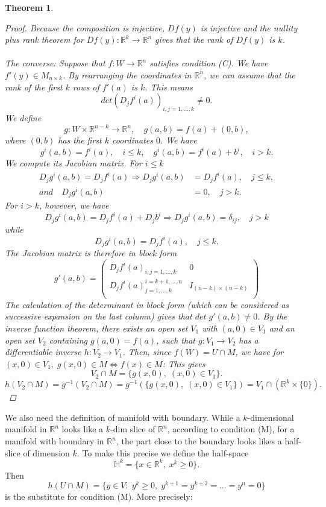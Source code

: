 \documentclass[12pt]{article}
\def\RR{\mathbb{R}}
\newtheorem{theorem}{Theorem}[section]
\begin{document}
\begin{theorem}
\begin{proof}
Because the composition is injective, $Df(y)$ is injective and the nullity plus rank theorem for $Df(y) : \RR^k \rightarrow \RR^n$ gives that the rank of $Df(y)$ is $k$.\\ \\
 \textit{The converse:} Suppose that $f : W \rightarrow \RR^n$ satisfies condition (C). We have $f'(y) \in M_{n\times k}$.
By rearranging the coordinates in $\RR^n$, we can assume that the rank of the first $k$ rows of $f'(a)$ is $k$. This means
\[det (D_jf^i(a))_{i,j=1,\dots ,k} \neq 0.\]
We define
\[g : W \times \RR^{n - k} \rightarrow \RR^n, \quad g(a, b) = f(a) + (0, b),\]
where $(0, b)$ has the first $k$ coordinates $0$. We have
\[g^i(a, b) = f^i(a), \quad i \leq k, \quad g^i(a, b) = f^i(a) + b^i, \quad i > k.\]
We compute its Jacobian matrix. For $i\leq k$
\begin{align*}
D_jg^i(a, b)  = D_jf^i(a) \Rightarrow D_jg^i(a, b) &= D_jf^i(a), \quad j \leq k,\\
and \quad D_jg^i(a, b) & = 0, \quad j > k.
\end{align*}
For $i > k$, however, we have
\[D_jg^i(a, b) = D_jf^i(a) + D_jb^i \Rightarrow D_jg^i(a, b) = \delta _{ij}, \quad j > k\]
while
\[D_jg^i(a, b)  = D_jf^i(a), \quad j \leq k.\]
The Jacobian matrix is therefore in block form
\[
 g'(a,b) =
 \left( \begin{array}{c|c}
 D_jf^i(a)_{i,j = 1,\dots , k}  & 0 \\
\hline
 D_jf^i(a)^{i=k+1 , \dots, n}_{j = 1,\dots , k}  & I_{(n-k)\times (n-k)} \\
 \end{array} \right)
\]
The calculation of the determinant in block form (which can be considered as successive expansion on the last column) gives that $det \;g'(a, b) \neq 0$. By the inverse function theorem, there exists an open set $V_1$ with $(a, 0) \in V_1$ and an open set $V_2$ containing $g(a, 0) = f(a)$, such that $g : V_1 \rightarrow V_2$ has a differentiable inverse $h : V_2 \rightarrow V_1$. Then, since $f(W) = U \cap M$, we have for $(x, 0) \in V_1,\; g(x, 0) \in M \Leftrightarrow f(x) \in M$: This gives
\[V_2 \cap M = \{g(x, 0), \; (x, 0) \in V_1\}.\]
\[h(V_2 \cap M) = g^{-1}(V_2 \cap M) = g^{-1}(\{g(x,  0), \; (x, 0) \in V_1\}) = V_1 \cap (\RR^k\times \{0\}).\]
\end{proof}
\end{theorem}
We also need the definition of manifold with boundary. While a $k$-dimensional manifold in $\RR^n$ looks like a $k$-dim  slice of $\RR^n$, according to condition (M), for a manifold with boundary in $\RR^n$, the part close to the boundary looks likes a half-slice of dimension $k$. To make this precise we define the half-space
\[\mathbb{H}^k = \{x \in \RR^k, \;  x^k \geq 0 \}.\]
Then
\[h(U \cap M) = \{ y \in V: \; y^k \geq 0, \;y^{k+1} = y^{k+2} = \dots = y^{n} = 0\}\]
is the substitute for condition (M). More precisely:
\end{document}
